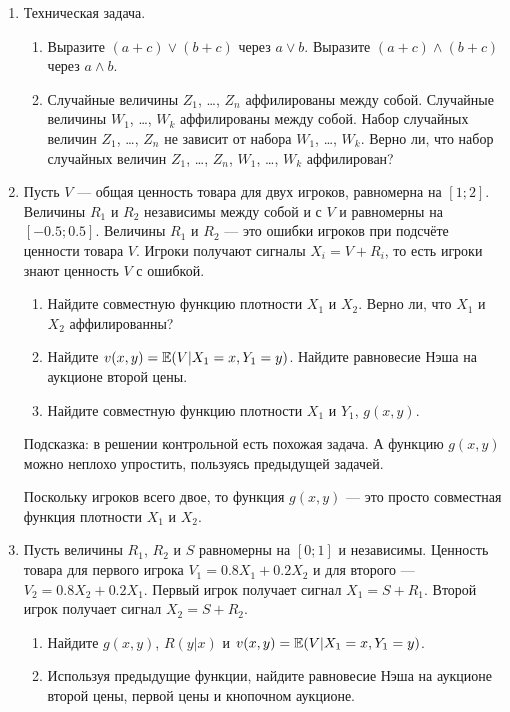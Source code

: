 \begin{enumerate}


\item Техническая задача.
\begin{enumerate}
\item Выразите $ (a+c)\vee (b+c) $ через $ a\vee b $. Выразите $ (a+c)\wedge (b+c) $ через $ a\wedge b $. 
\item Случайные величины $ Z_{1} $, \ldots , $ Z_{n} $ аффилированы между собой. Случайные величины $ W_{1} $, \ldots , $ W_{k} $ аффилированы между собой. Набор случайных величин $ Z_{1} $, \ldots , $ Z_{n} $ не зависит от набора $ W_{1} $, \ldots , $ W_{k} $. Верно ли, что набор случайных величин $ Z_{1} $, \ldots , $ Z_{n} $, $ W_{1} $, \ldots , $ W_{k} $ аффилирован?
\end{enumerate}


\item Пусть $  V $ — общая ценность товара для двух игроков, равномерна на $ [1;2] $. Величины $ R_{1} $ и $ R_{2} $ независимы между собой и с $ V $ и равномерны на $ [-0.5;0.5] $. Величины $ R_{1} $ и $ R_{2} $ — это ошибки игроков при подсчёте ценности товара $ V $. Игроки получают сигналы $ X_{i}=V+R_{i} $, то есть игроки знают ценность  $ V $ с ошибкой.
\begin{enumerate}
\item Найдите совместную функцию плотности $ X_{1} $ и $ X_{2} $. Верно ли, что $ X_{1} $ и $ X_{2} $ аффилированны? 
\item Найдите $ v(x,y)=\operatorname{\mathbb{E}}(V|X_{1}=x,Y_{1}=y) $. Найдите равновесие Нэша на аукционе второй цены.
\item Найдите совместную функцию плотности $ X_{1} $ и $ Y_{1} $, $ g(x,y) $.
\end{enumerate}

Подсказка: в решении контрольной есть похожая задача. А функцию $ g(x,y) $ можно неплохо упростить, пользуясь предыдущей задачей.

Поскольку игроков всего двое, то функция $ g(x,y)$ — это просто совместная функция плотности $ X_{1} $ и $ X_{2} $.


\item Пусть величины $ R_{1} $, $ R_{2} $ и $ S $ равномерны на $ [0;1] $ и независимы. Ценность товара для первого игрока $ V_{1}=0.8X_{1}+0.2X_{2} $ и для второго — $ V_{2}=0.8X_{2}+0.2X_{1} $. Первый игрок получает сигнал $ X_{1}=S+R_{1} $. Второй игрок получает сигнал $ X_{2}=S+R_{2} $.
\begin{enumerate}
\item Найдите $ g(x,y) $, $ R(y|x) $ и $ v(x,y)=\operatorname{\mathbb{E}}(V|X_{1}=x,Y_{1}=y) $.
\item Используя предыдущие функции, найдите равновесие Нэша на аук\-цио\-не второй цены, первой цены и кнопочном аукционе.
\end{enumerate}


\end{enumerate}
